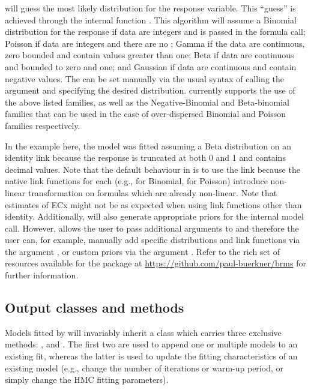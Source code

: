 \documentclass[
  shortnames]{jss}
\begin{document}
 will guess the most likely distribution for the response variable. This ``guess'' is achieved through the internal function . This algorithm will assume a Binomial distribution for the response if data are integers and  is passed in the formula call; Poisson if data are integers and there are no ; Gamma if the data are continuous, zero bounded and contain values greater than one; Beta if data are continuous and bounded to zero and one; and Gaussian if data are continuous and contain negative values. The  can be set manually via the usual  syntax of calling the argument  and specifying the desired distribution.  currently supports the use of the above listed families, as well as the Negative-Binomial and Beta-binomial families that can be used in the case of over-dispersed Binomial and Poisson families respectively.

In the example here, the model was fitted assuming a Beta distribution on an identity link because the response is truncated at both 0 and 1 and contains decimal values. Note that the default behaviour in  is to use the  link because the native link functions for each  (e.g.,  for Binomial,  for Poisson) introduce non-linear transformation on formulas which are already non-linear. Note that estimates of ECx might not be as expected when using link functions other than identity. Additionally,  will also generate appropriate priors for the internal  model call. However,  allows the user to pass additional arguments to  and therefore the user can, for example, manually add specific distributions and link functions via the argument , or custom priors via the argument . Refer to the rich set of resources available for the  package at \url{https://github.com/paul-buerkner/brms} for further information.

\hypertarget{output-classes-and-methods}{%
\subsection{Output classes and methods}\label{output-classes-and-methods}}

Models fitted by  will invariably inherit a class  which carries three exclusive methods: \code{+},  and . The first two are used to append one or multiple models to an existing fit, whereas the latter is used to update the fitting characteristics of an existing model (e.g., change the number of iterations or warm-up period, or simply change the HMC fitting parameters).
\end{document}
